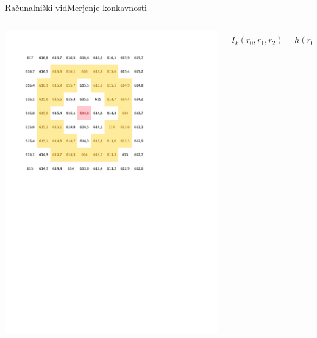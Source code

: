 \documentclass{beamer}
\begin{document}
\begin{frame}{Računalniški vid}{Merjenje konkavnosti}

\begin{columns}
  \begin{column}{0.5\textwidth}
    \includegraphics[width=\textwidth]{slike/concavity-ring-visualisation-2}
  \end{column}
  \begin{column}{0.6\textwidth}
  \footnotesize
  \begin{equation}  I_k(r_0,r_1,r_2) = h(r_0)- \frac{1}{N}\sum\limits_{r_1<r<r_2} h(r). \label{ik} \end{equation}
  \end{column}
\end{columns}

\end{frame}
\end{document}
